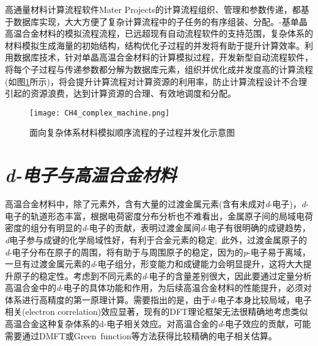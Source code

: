 高通量材料计算流程软件\textrm{Mater Projects}的计算流程组织、管理和参数传递，都基于数据库实现，大大方便了复杂计算流程中的子任务的有序组装、分配。-基单晶高温合金材料的模拟流程流程，已远超现有自动流程软件的支持范围，复杂体系的材料模拟生成海量的初始结构，结构优化子过程的并发将有助于提升计算效率。利用数据库技术，针对单晶高温合金材料的计算模拟过程，开发新型自动流程软件，将每个子过程与传递参数都分解为数据库元素，组织并优化成并发度高的计算流程(如图\ref{CH4_comp_BCC}所示)，将会提升计算流程对计算资源的利用率，防止计算流程设计不合理引起的资源浪费，达到计算资源的合理、有效地调度和分配。 
\begin{figure}[h!]
\centering
\vskip -2pt
\texttt{[image: CH4\_complex\_machine.png]}
\caption{面向复杂体系材料模拟顺序流程的子过程并发化示意图}%
\label{CH4_comp_BCC}
\end{figure}

\section{\it{d}-电子与高温合金材料}
高温合金材料中，除了元素外，含有大量的过渡金属元素(含有未成对\textit{d}-电子)，\textit{d}-电子的轨道形态丰富，根据电荷密度分布分析也不难看出，金属原子间的局域电荷密度的组分有明显的\textit{d}-电子的贡献，表明过渡金属间\textit{d}-电子有很明确的成键趋势，\textit{d}电子参与成键的化学局域性好，有利于合金元素的稳定;~此外，过渡金属原子的\textit{d}-电子分布在原子的周围，将有助于与周围原子的稳定，因为的\textit{p}-电子易于离域，一旦有过渡金属元素的\textit{d}-电子组分，形变能力和成键能力会明显提升，这将大大提升原子的稳定性。考虑到不同元素的\textit{d}-电子的含量差别很大，因此要通过定量分析高温合金中的\textit{d}-电子的具体功能和作用，为后续高温合金材料的性能提升，必须对体系进行高精度的第一原理计算。需要指出的是，由于\textit{d}-电子本身比较局域，电子相关(\textrm{electron correlation})效应显著，现有的\textrm{DFT}理论框架无法很精确地考虑类似高温合金这种复杂体系的\textrm{d}-电子相关效应。对高温合金的\textit{d}-电子效应的贡献，可能需要通过\textrm{DMFT}或\textrm{Green~function}等方法获得比较精确的电子相关估算。

